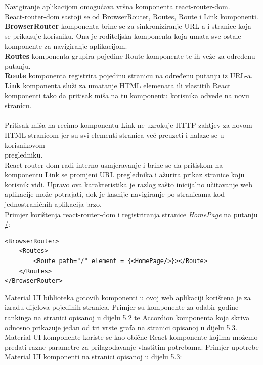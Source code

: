 \documentclass[times, utf8, zavrsni]{fer}
\begin{document}
\\\\Navigiranje aplikacijom omogućava vršna komponenta react-router-dom.
\\React-router-dom sastoji se od BrowserRouter, Routes, Route i Link komponenti. 
\\\textbf{BrowserRouter} komponenta brine se za sinkroniziranje URL-a i stranice koja se prikazuje korisniku. Ona je roditeljska komponenta koja umata sve ostale komponente za navigiranje aplikacijom.
\\\textbf{Routes} komponenta grupira pojedine Route komponente te ih veže za određenu putanju.
\\\textbf{Route} komponenta registrira pojedinu stranicu na određenu putanju iz URL-a.
\\\textbf{Link} komponenta služi za umatanje HTML elemenata ili vlastitih React komponenti tako da pritisak miša na tu komponentu korisnika odvede na novu stranicu.
\\\\Pritisak miša na recimo komponentu Link ne uzrokuje HTTP zahtjev za novom HTML stranicom jer su svi elementi stranica već preuzeti i nalaze se u korisnikovom \\pregledniku.
\\React-router-dom radi interno usmjeravanje i brine se da pritiskom na komponentu Link se promjeni URL preglednika i ažurira prikaz stranice koju korisnik vidi.
Upravo ova karakteristika je razlog zašto inicijalno učitavanje web aplikacije može potrajati, dok je kasnije navigiranje po stranicama kod jednostraničnih aplikacija brzo.
\\Primjer korištenja react-router-dom i registriranja stranice \emph{HomePage} na putanju \url{/}:
\begin{verbatim}
<BrowserRouter>
    <Routes>
        <Route path="/" element = {<HomePage/>}></Route>
    </Routes>
</BrowserRouter>
\end{verbatim}
Material UI biblioteka gotovih komponenti u ovoj web aplikaciji korištena je za izradu dijelova pojedinih stranica. Primjer su komponente za odabir godine rankinga
na stranici opisanoj u dijelu 5.2 te Accordion komponenta koja skriva odnosno prikazuje jedan od tri vrste grafa na stranici opisanoj u dijelu 5.3.
Material UI komponente koriste se kao obične React komponente kojima možemo predati razne parametre za prilagođavanje vlastitim potrebama.
Primjer upotrebe Material UI komponenti na stranici opisanoj u dijelu 5.3:
\end{document}
